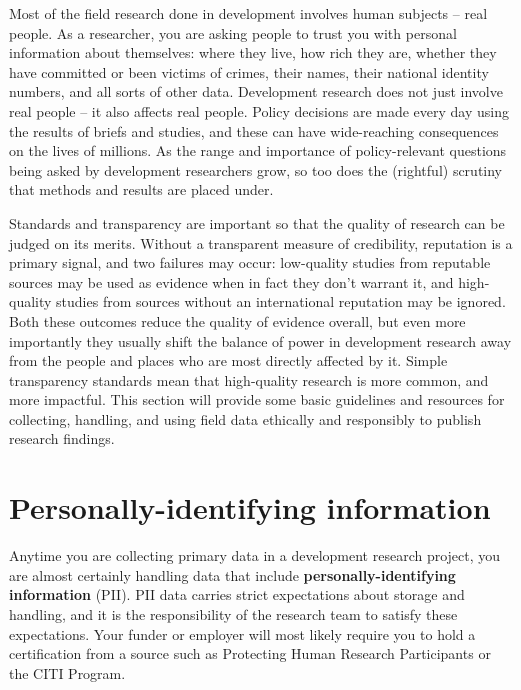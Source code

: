 
\begin{fullwidth}
Most of the field research done in development involves human subjects -- real people.
As a researcher, you are asking people to trust you with personal information about themselves:
where they live, how rich they are, whether they have committed or been victims of crimes,
their names, their national identity numbers, and all sorts of other data.
Development research does not just involve real people -- it also affects real people.
Policy decisions are made every day using the results of briefs and studies,
and these can have wide-reaching consequences on the lives of millions.
As the range and importance of policy-relevant questions being asked by development researchers grow,
so too does the (rightful) scrutiny that methods and results are placed under.

Standards and transparency are important so that the quality of research can be judged on its merits.
Without a transparent measure of credibility, reputation is a primary signal, and two failures may occur:
low-quality studies from reputable sources may be used as evidence when in fact they don't warrant it,
and high-quality studies from sources without an international reputation may be ignored.
Both these outcomes reduce the quality of evidence overall,
but even more importantly they usually shift the balance of power in development research
away from the people and places who are most directly affected by it.
Simple transparency standards mean that high-quality research is more common, and more impactful.
This section will provide some basic guidelines and resources
for collecting, handling, and using field data ethically and responsibly to publish research findings.
\end{fullwidth}


\section{Personally-identifying information}

Anytime you are collecting primary data in a development research project,
you are almost certainly handling data that include \textbf{personally-identifying information} (PII).
PII data carries strict expectations about storage and handling,
and it is the responsibility of the research team to satisfy these expectations.
Your funder or employer will most likely require you to hold a certification from a source
such as Protecting Human Research Participants
or the CITI Program.

